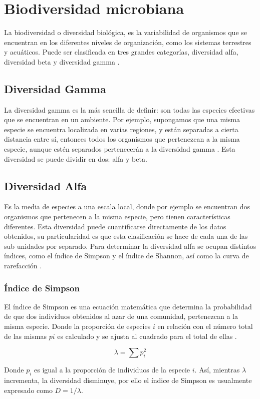 \documentclass[12pt,letterpaper,oneside]{report}
\begin{document}
\section{Biodiversidad microbiana}
La biodiversidad o diversidad biológica, es la variabilidad de organismos que se encuentran en los diferentes niveles de organización, como los sistemas terrestres y acuáticos. Puede ser clasificada en tres grandes categorías, diversidad alfa, diversidad beta y diversidad gamma \autocite{Magurran2013,Tuomisto2010a}.
\subsection{Diversidad Gamma}
La diversidad gamma es la más sencilla de definir: son todas las especies efectivas que se encuentran en un ambiente. Por ejemplo, supongamos que una misma especie se encuentra localizada en varias regiones, y están separadas a cierta distancia entre sí, entonces todos los organismos que pertenezcan a la misma especie, aunque estén separados pertenecerán a la diversidad gamma \autocite{Hunter2007}. Esta diversidad se puede dividir en dos: alfa y beta.
\newpage
\subsection{Diversidad Alfa}
Es la media de especies a una escala local, donde por ejemplo se encuentran dos organismos que pertenecen a la misma especie, pero tienen características diferentes. Esta diversidad puede cuantificarse directamente de los datos obtenidos, su particularidad es que esta clasificación se hace de cada una de las sub unidades por separado. Para determinar la diversidad alfa se ocupan distintos índices, como el índice de Simpson y el índice de Shannon, así como la curva de rarefacción \autocite{Tuomisto2010}.
\subsubsection{Índice de Simpson}
El índice de Simpson es una ecuación matemática que determina la probabilidad de que dos individuos obtenidos al azar de una comunidad, pertenezcan a la misma especie. Donde la proporción de especies \(i\) en relación con el número total de las mismas \(pi\) es calculado y se ajusta al cuadrado para el total de ellas \autocite{Tuomisto2010}. 
\begin{large}
 \[\lambda=\sum p_i^{2}\]
\end{large}
Donde \(p_i\) es igual a la proporción de individuos de la especie \(i\). Así, mientras \(\lambda\) incrementa, la diversidad disminuye, por ello el índice de Simpson es usualmente expresado como \(D= 1/\lambda\).
\end{document}
